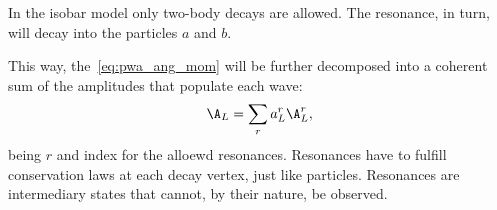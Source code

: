 In the isobar model only two-body decays are allowed.
The resonance, in turn, will decay into the particles $a$ and $b$.


This way, the~\eqref{eq:pwa_ang_mom} will be further decomposed into a coherent sum of the amplitudes that populate each wave:
\begin{equation}
    \A_L = \sum_r a_L^r \A_L^r,
\end{equation}
being $r$ and index for the alloewd resonances.
Resonances have to fulfill conservation laws at each decay vertex, just like particles.
Resonances are intermediary states that cannot, by their nature, be observed.



